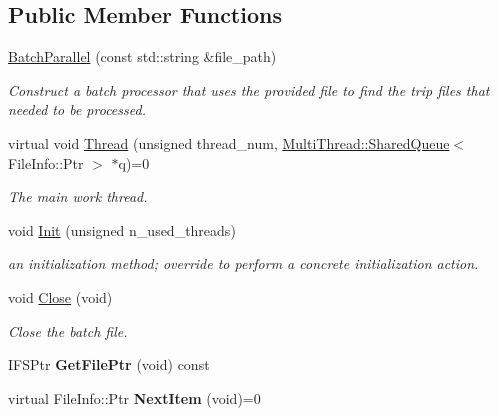 \subsection*{Public Member Functions}
\begin{DoxyCompactItemize}
\item 
\hyperlink{classcvdi__multi_1_1BatchParallel_ab759b92c4cd881df5ad39f8bfa940775}{Batch\+Parallel} (const std\+::string \&file\+\_\+path)
\begin{DoxyCompactList}\small\item\em Construct a batch processor that uses the provided file to find the trip files that needed to be processed. \end{DoxyCompactList}\item 
virtual void \hyperlink{classcvdi__multi_1_1BatchParallel_a23fd90da6768ad102e3ce5968ab11410}{Thread} (unsigned thread\+\_\+num, \hyperlink{classMultiThread_1_1SharedQueue}{Multi\+Thread\+::\+Shared\+Queue}$<$ File\+Info\+::\+Ptr $>$ $\ast$q)=0
\begin{DoxyCompactList}\small\item\em The main work thread. \end{DoxyCompactList}\item 
void \hyperlink{classcvdi__multi_1_1BatchParallel_a40f083a185b29a90733ada3fe789ada2}{Init} (unsigned n\+\_\+used\+\_\+threads)
\begin{DoxyCompactList}\small\item\em an initialization method; override to perform a concrete initialization action. \end{DoxyCompactList}\item 
void \hyperlink{classcvdi__multi_1_1BatchParallel_a5b9282057e92cd34460340a6f9625c8d}{Close} (void)\hypertarget{classcvdi__multi_1_1BatchParallel_a5b9282057e92cd34460340a6f9625c8d}{}\label{classcvdi__multi_1_1BatchParallel_a5b9282057e92cd34460340a6f9625c8d}

\begin{DoxyCompactList}\small\item\em Close the batch file. \end{DoxyCompactList}\item 
I\+F\+S\+Ptr {\bfseries Get\+File\+Ptr} (void) const \hypertarget{classcvdi__multi_1_1BatchParallel_a7d086bbc76e0a98821c4cadc1b6b3ed2}{}\label{classcvdi__multi_1_1BatchParallel_a7d086bbc76e0a98821c4cadc1b6b3ed2}

\item 
virtual File\+Info\+::\+Ptr {\bfseries Next\+Item} (void)=0\hypertarget{classcvdi__multi_1_1BatchParallel_add9bacacd5d698fdd077efcaa9c9c5f1}{}\label{classcvdi__multi_1_1BatchParallel_add9bacacd5d698fdd077efcaa9c9c5f1}

\end{DoxyCompactItemize}


